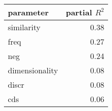 \begin{tabular}{lr}
\toprule
      parameter &  partial $R^2$ \\
\midrule
     similarity &       0.38 \\
           freq &       0.27 \\
            neg &       0.24 \\
 dimensionality &       0.08 \\
          discr &       0.08 \\
            cds &       0.06 \\
\bottomrule
\end{tabular}
